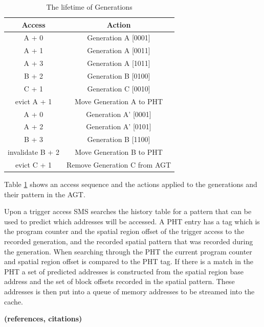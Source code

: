 \begin{table}[htbp]
  \centering
  \begin{tabular}{| c | c |}
    \hline
    {\bf Access} & {\bf Action} \\ \hline
    A + 0 & Generation A [0001]\\ \hline
    A + 1 & Generation A [0011]\\ \hline
    A + 3 & Generation A [1011]\\ \hline
    B + 2 & Generation B [0100]\\ \hline
    C + 1 & Generation C [0010] \\ \hline
    evict A + 1 & Move Generation A to PHT\\ \hline
    A + 0 & Generation A' [0001]\\ \hline
    A + 2 & Generation A' [0101]\\ \hline
    B + 3 & Generation B [1100] \\ \hline
    invalidate B + 2 & Move Generation B to PHT\\ \hline
    evict C + 1 & Remove Generation C from AGT \\ \hline    
  \end{tabular}
  \caption{The lifetime of Generations}
  \label{tab:generation}
\end{table}
Table \ref{tab:generation} shows an access sequence and the
actions applied to the generations and their pattern in the AGT.

Upon a trigger access SMS searches the history table for a pattern
that can be used to predict which addresses will be accessed.  A PHT
entry has a tag which is the program counter and the spatial region
offset of the trigger access to the recorded generation, and the
recorded spatial pattern that was recorded during the generation.
When searching through the PHT the current program counter and spatial
region offset is compared to the PHT tag. If there is a match in the
PHT a set of predicted addresses is constructed from the spatial
region base address and the set of block offsets recorded in the
spatial pattern. These addresses is then put into a queue of memory
addresses to be streamed into the cache.
 

{\bf (references, citations)}

